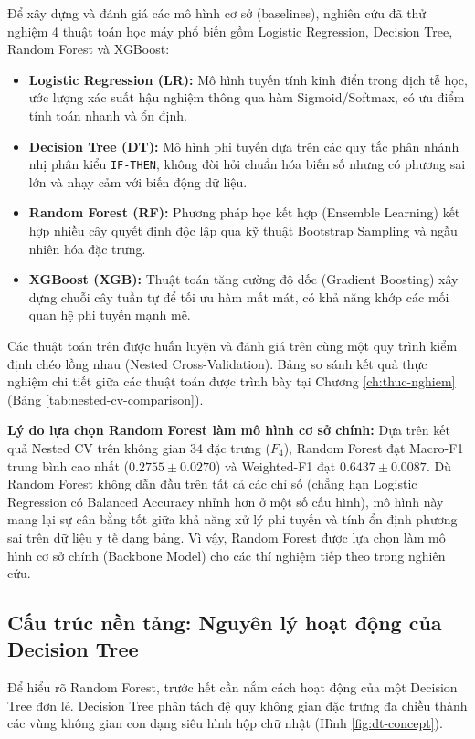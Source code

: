Để xây dựng và đánh giá các mô hình cơ sở (baselines), nghiên cứu đã thử nghiệm 4 thuật toán học máy phổ biến gồm Logistic Regression, Decision Tree, Random Forest và XGBoost:
\begin{itemize}
    \item \textbf{Logistic Regression (LR):} Mô hình tuyến tính kinh điển trong dịch tễ học, ước lượng xác suất hậu nghiệm thông qua hàm Sigmoid/Softmax, có ưu điểm tính toán nhanh và ổn định.
    \item \textbf{Decision Tree (DT):} Mô hình phi tuyến dựa trên các quy tắc phân nhánh nhị phân kiểu \texttt{IF-THEN}, không đòi hỏi chuẩn hóa biến số nhưng có phương sai lớn và nhạy cảm với biến động dữ liệu.
    \item \textbf{Random Forest (RF):} Phương pháp học kết hợp (Ensemble Learning) kết hợp nhiều cây quyết định độc lập qua kỹ thuật Bootstrap Sampling và ngẫu nhiên hóa đặc trưng.
    \item \textbf{XGBoost (XGB):} Thuật toán tăng cường độ dốc (Gradient Boosting) xây dựng chuỗi cây tuần tự để tối ưu hàm mất mát, có khả năng khớp các mối quan hệ phi tuyến mạnh mẽ.
\end{itemize}

Các thuật toán trên được huấn luyện và đánh giá trên cùng một quy trình kiểm định chéo lồng nhau (Nested Cross-Validation). Bảng so sánh kết quả thực nghiệm chi tiết giữa các thuật toán được trình bày tại Chương \ref{ch:thuc-nghiem} (Bảng \ref{tab:nested-cv-comparison}).

\textbf{Lý do lựa chọn Random Forest làm mô hình cơ sở chính:} Dựa trên kết quả Nested CV trên không gian 34 đặc trưng ($F_4$), Random Forest đạt Macro-F1 trung bình cao nhất ($0.2755 \pm 0.0270$) và Weighted-F1 đạt $0.6437 \pm 0.0087$. Dù Random Forest không dẫn đầu trên tất cả các chỉ số (chẳng hạn Logistic Regression có Balanced Accuracy nhỉnh hơn ở một số cấu hình), mô hình này mang lại sự cân bằng tốt giữa khả năng xử lý phi tuyến và tính ổn định phương sai trên dữ liệu y tế dạng bảng. Vì vậy, Random Forest được lựa chọn làm mô hình cơ sở chính (Backbone Model) cho các thí nghiệm tiếp theo trong nghiên cứu.

\subsection{Cấu trúc nền tảng: Nguyên lý hoạt động của Decision Tree}
\label{subsec:decision-tree-theory}

Để hiểu rõ Random Forest, trước hết cần nắm cách hoạt động của một Decision Tree đơn lẻ. Decision Tree phân tách đệ quy không gian đặc trưng đa chiều thành các vùng không gian con dạng siêu hình hộp chữ nhật (Hình \ref{fig:dt-concept}).

